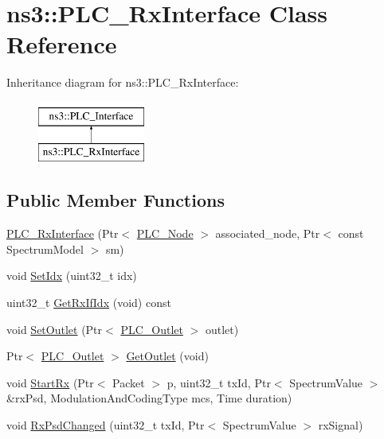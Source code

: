 \hypertarget{classns3_1_1PLC__RxInterface}{\section{ns3\-:\-:\-P\-L\-C\-\_\-\-Rx\-Interface \-Class \-Reference}
\label{classns3_1_1PLC__RxInterface}
}
\-Inheritance diagram for ns3\-:\-:\-P\-L\-C\-\_\-\-Rx\-Interface\-:\begin{figure}[H]
\begin{center}
\leavevmode
\includegraphics[height=2.000000cm]{classns3_1_1PLC__RxInterface}
\end{center}
\end{figure}
\subsection*{\-Public \-Member \-Functions}
\begin{DoxyCompactItemize}
\item 
\hyperlink{classns3_1_1PLC__RxInterface_aaa0968f79a07db808c0122c28ec25204}{\-P\-L\-C\-\_\-\-Rx\-Interface} (\-Ptr$<$ \hyperlink{classns3_1_1PLC__Node}{\-P\-L\-C\-\_\-\-Node} $>$ associated\-\_\-node, \-Ptr$<$ const \-Spectrum\-Model $>$ sm)
\item 
void \hyperlink{classns3_1_1PLC__RxInterface_a2760adb4b1bda24377254c7fec9cd21d}{\-Set\-Idx} (uint32\-\_\-t idx)
\item 
uint32\-\_\-t \hyperlink{classns3_1_1PLC__RxInterface_aa0c5595df05fa4bdfe66e7ddb24059fc}{\-Get\-Rx\-If\-Idx} (void) const 
\item 
void \hyperlink{classns3_1_1PLC__RxInterface_ad7659f89d745e25b469beb2dfcc475d1}{\-Set\-Outlet} (\-Ptr$<$ \hyperlink{classns3_1_1PLC__Outlet}{\-P\-L\-C\-\_\-\-Outlet} $>$ outlet)
\item 
\-Ptr$<$ \hyperlink{classns3_1_1PLC__Outlet}{\-P\-L\-C\-\_\-\-Outlet} $>$ \hyperlink{classns3_1_1PLC__RxInterface_a51921ebe8b6889afe7df65329a272d47}{\-Get\-Outlet} (void)
\item 
void \hyperlink{classns3_1_1PLC__RxInterface_aaad8e59970851ef619f4f4109bcde74c}{\-Start\-Rx} (\-Ptr$<$ \-Packet $>$ p, uint32\-\_\-t tx\-Id, \-Ptr$<$ \-Spectrum\-Value $>$ \&rx\-Psd, \-Modulation\-And\-Coding\-Type mcs, \-Time duration)
\item 
void \hyperlink{classns3_1_1PLC__RxInterface_a5ed074ad9563a148975b3b5b3e15eb40}{\-Rx\-Psd\-Changed} (uint32\-\_\-t tx\-Id, \-Ptr$<$ \-Spectrum\-Value $>$ rx\-Signal)
\end{DoxyCompactItemize}
